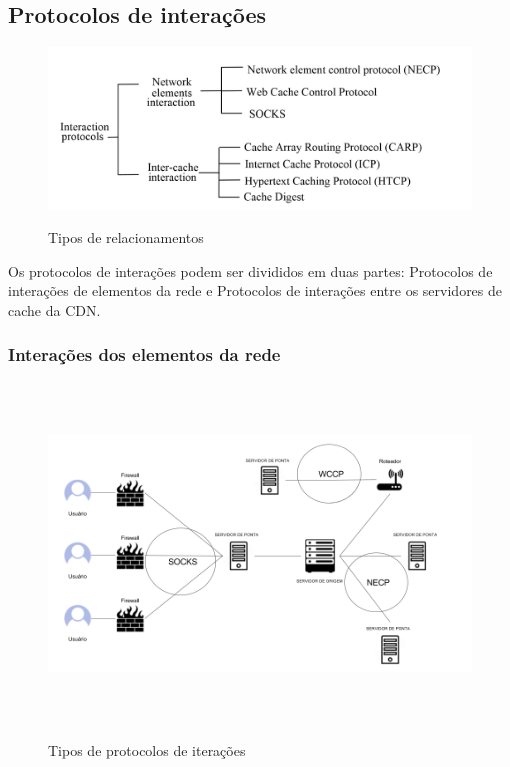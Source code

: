 \subsection{Protocolos de intera\c{c}\~oes}
\label{section:protocolos_interacoes}
\begin{figure}[H]
\caption{Tipos de relacionamentos}
\includegraphics[width=15cm]{Figuras/tipos_relacionamentos.png} 
\label{figura:tipos_relacionamentos}
\end{figure}

Os protocolos de intera\c{c}\~oes podem ser divididos em duas partes: Protocolos de intera\c{c}\~oes de elementos da rede e Protocolos de intera\c{c}\~oes entre os servidores de cache da CDN. 


\subsubsection{Intera\c{c}\~oes dos elementos da rede}
\begin{figure}[H]
\caption{Tipos de protocolos de itera\c{c}\~oes}
\includegraphics[height=9cm]{Figuras/protocolos_interacao_elementos.png} 
\label{figura:protocolos_interacao_elementos}
\end{figure}

